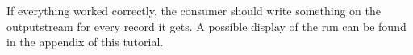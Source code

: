 		\setBashListing 		
				

		If everything worked correctly, the consumer should write something on the outputstream for every record it gets. A possible display of the run can be found in the appendix of this tutorial. 